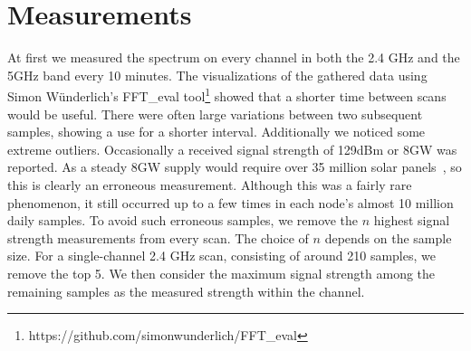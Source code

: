 \documentclass[a4paper, 11pt]{article}
\begin{document}
\section{Measurements}


At first we measured the spectrum on every channel in both the 2.4 GHz and the 5GHz band every 10 minutes. The visualizations of the gathered data using Simon W{\"u}nderlich's FFT\_eval tool\footnote{https://github.com/simonwunderlich/FFT\_eval} showed that a shorter time between scans would be useful. There were often large variations between two subsequent samples, showing a use for a shorter interval. Additionally we noticed some extreme outliers. Occasionally a received signal strength of 129dBm or 8GW was reported. As a steady 8GW supply would require over 35 million solar panels~\cite{gigawatt}, so this is clearly an erroneous measurement. Although this was a fairly rare phenomenon, it still occurred up to a few times in each node's almost 10 million daily samples. To avoid such erroneous samples, we remove the $n$ highest signal strength measurements from every scan. The choice of $n$ depends on the sample size. For a single-channel 2.4 GHz scan, consisting of around 210 samples, we remove the top 5. We then consider the maximum signal strength among the remaining samples as the measured strength within the channel. \\
\end{document}
